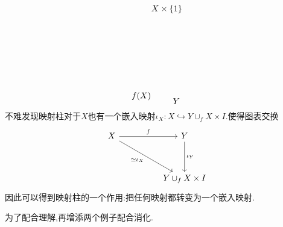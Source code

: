 \documentclass{article}
\begin{document}
\begin{example}
\[\begin{tikzpicture}[x=0.75pt,y=0.75pt,yscale=-1,xscale=1]
\draw (189,159.4) node [anchor=north west][inner sep=0.75pt]    {$f( X)$};
\draw (220,21.4) node [anchor=north west][inner sep=0.75pt]    {$X\times \{1\}$};
\draw (254,169.4) node [anchor=north west][inner sep=0.75pt]    {$Y$};
\end{tikzpicture}\]
不难发现映射柱对于$X$也有一个嵌入映射$\iota_X : X \hookrightarrow Y \cup_f X \times I$.使得图表交换
\[\begin{tikzcd}
	X && Y \\
	\\
	&& {Y \cup_f X\times I}
	\arrow["f", from=1-1, to=1-3]
	\arrow["{\iota_Y}", from=1-3, to=3-3]
	\arrow["{\simeq \iota_X}"', from=1-1, to=3-3]
\end{tikzcd}\]
因此可以得到映射柱的一个作用:把任何映射都转变为一个嵌入映射.
\end{example}
为了配合理解,再增添两个例子配合消化.
\end{document}
